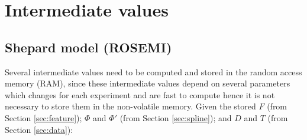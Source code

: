 \documentclass[12pt]{article}
\begin{document}
\section{Intermediate values}
\label{sec:intermediate}

\subsection{Shepard model (ROSEMI)}
Several intermediate values need to be computed and stored in the random access memory (RAM), since these intermediate values depend on several parameters which changes for each experiment and are fast to compute hence it is not necessary to store them in the non-volatile memory. Given the stored $F$ (from Section \ref{sec:feature}); $\Phi$ and $\Phi'$ (from Section \ref{sec:spline}); and $D$ and $T$ (from Section \ref{sec:data}):
\end{document}

